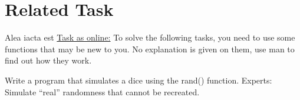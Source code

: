 \section{Related Task}

\begin{frame}{Alea iacta est}
    \href{http://fsr.github.io/c-lessons/exercises/14_alea_iacta_est.html}{Task as online:} \newline
    To solve the following tasks, you need to use some functions that may be new to you.
    No explanation is given on them, use man to find out how they work.

    Write a program that simulates a dice using the rand() function.
    \newline 
    \newline
    Experts: Simulate “real” randomness that cannot be recreated.
\end{frame}

